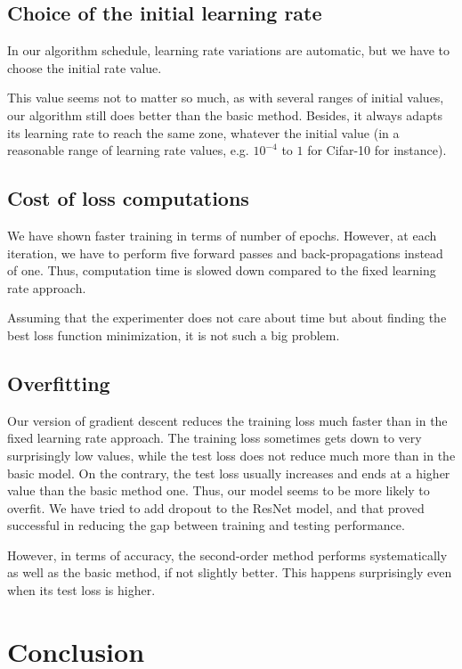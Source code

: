 \documentclass{article}
\begin{document}
  \subsection{Choice of the initial learning rate}
  
  In our algorithm schedule, learning rate variations are automatic, but we have to choose the initial rate value. 
  
  This value seems not to matter so much, as with several ranges of initial values, our algorithm still does better than the basic method. Besides, it always adapts its learning rate to reach the same zone, whatever the initial value (in a reasonable range of learning rate values, e.g. $10^{-4}$ to $1$ for Cifar-10 for instance).
  
  \subsection{Cost of loss computations}
  
  We have shown faster training in terms of number of epochs. However, at each iteration, we have to perform five forward passes and back-propagations instead of one. Thus, computation time is slowed down compared to the fixed learning rate approach. 
  
  Assuming that the experimenter does not care about time but about finding the best loss function minimization, it is not such a big problem.
  
  \subsection{Overfitting}
  
  Our version of gradient descent reduces the training loss much faster than in the fixed learning rate approach. The training loss sometimes gets down to very surprisingly low values, while the test loss does not reduce much more than in the basic model. On the contrary, the test loss usually increases and ends at a higher value than the basic method one. Thus, our model seems to be more likely to overfit. We have tried to add dropout to the ResNet model, and that proved successful in reducing the gap between training and testing performance.
  
  However, in terms of accuracy, the second-order method performs systematically as well as the basic method, if not slightly better. This happens surprisingly even when its test loss is higher. 
  
  \section{Conclusion}
  
\end{document}
